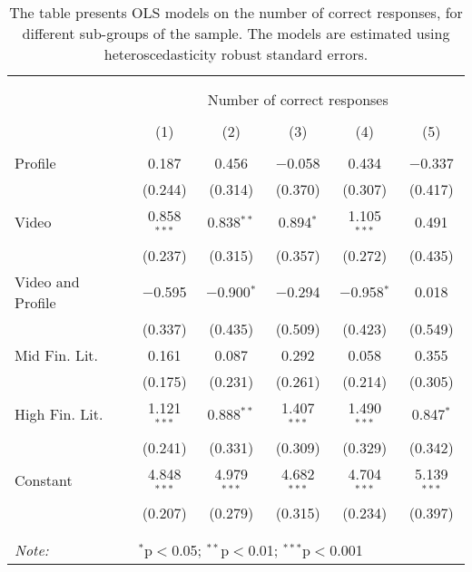 
\begin{table}[H] \centering 
  \caption{The table presents OLS models on the number of correct responses, for different sub-groups of the sample. The models are estimated
            using heteroscedasticity robust standard errors.} 
  \label{tbl:Main_results_correct_response_lab} 
\begin{tabular}{@{\extracolsep{5pt}}lccccc} 
\\[-1.8ex]\hline 
\hline \\[-1.8ex] 
\\[-1.8ex] & \multicolumn{5}{c}{Number of correct responses} \\ 
\\[-1.8ex] & (1) & (2) & (3) & (4) & (5)\\ 
\hline \\[-1.8ex] 
 Profile & 0.187 & 0.456 & $-$0.058 & 0.434 & $-$0.337 \\ 
  & (0.244) & (0.314) & (0.370) & (0.307) & (0.417) \\ 
  Video & 0.858$^{***}$ & 0.838$^{**}$ & 0.894$^{*}$ & 1.105$^{***}$ & 0.491 \\ 
  & (0.237) & (0.315) & (0.357) & (0.272) & (0.435) \\ 
  Video and Profile & $-$0.595 & $-$0.900$^{*}$ & $-$0.294 & $-$0.958$^{*}$ & 0.018 \\ 
  & (0.337) & (0.435) & (0.509) & (0.423) & (0.549) \\ 
  Mid Fin. Lit. & 0.161 & 0.087 & 0.292 & 0.058 & 0.355 \\ 
  & (0.175) & (0.231) & (0.261) & (0.214) & (0.305) \\ 
  High Fin. Lit. & 1.121$^{***}$ & 0.888$^{**}$ & 1.407$^{***}$ & 1.490$^{***}$ & 0.847$^{*}$ \\ 
  & (0.241) & (0.331) & (0.309) & (0.329) & (0.342) \\ 
  Constant & 4.848$^{***}$ & 4.979$^{***}$ & 4.682$^{***}$ & 4.704$^{***}$ & 5.139$^{***}$ \\ 
  & (0.207) & (0.279) & (0.315) & (0.234) & (0.397) \\ 
 \hline \\[-1.8ex] 
\hline 
\hline \\[-1.8ex] 
\textit{Note:}  & \multicolumn{5}{l}{$^{*}$p$<$0.05; $^{**}$p$<$0.01; $^{***}$p$<$0.001} \\ 
\end{tabular} 
\end{table} 
